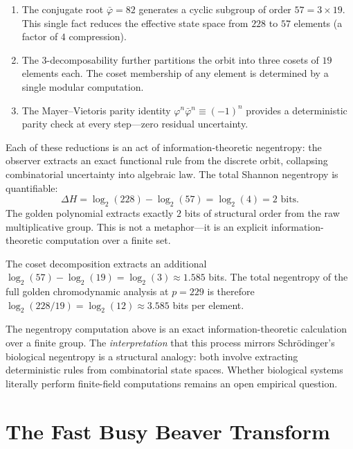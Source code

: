 \begin{enumerate}
  \item The conjugate root $\bar\varphi = 82$ generates a cyclic
    subgroup of order $57 = 3 \times 19$. This single fact reduces
    the effective state space from $228$ to $57$ elements (a factor
    of $4$ compression).
  \item The $3$-decomposability further partitions the orbit into
    three cosets of $19$ elements each. The coset membership of
    any element is determined by a single modular computation.
  \item The Mayer--Vietoris parity identity
    $\varphi^n \bar\varphi^n \equiv (-1)^n$ provides a deterministic
    parity check at every step---zero residual uncertainty.
\end{enumerate}

Each of these reductions is an act of information-theoretic negentropy: the observer
extracts an exact functional rule from the discrete orbit,
collapsing combinatorial uncertainty into algebraic law. The
total Shannon negentropy is quantifiable:
\[
\Delta H = \log_2(228) - \log_2(57) = \log_2(4) = 2 \text{ bits.}
\]
The golden polynomial extracts exactly $2$ bits of structural
order from the raw multiplicative group. This is not a metaphor---it
is an explicit information-theoretic computation over a finite set.

The coset decomposition extracts an additional
$\log_2(57) - \log_2(19) = \log_2(3) \approx 1.585$ bits. The
total negentropy of the full golden chromodynamic analysis at
$p = 229$ is therefore $\log_2(228/19) = \log_2(12) \approx 3.585$
bits per element.

\begin{remark}
The negentropy computation above is an exact information-theoretic
calculation over a finite group. The \emph{interpretation} that this
process mirrors Schr\"odinger's biological negentropy is a structural
analogy: both involve extracting deterministic rules from combinatorial
state spaces. Whether biological systems literally perform finite-field
computations remains an open empirical question.
\end{remark}

\section{The Fast Busy Beaver Transform}
\label{sec:fbbt}

